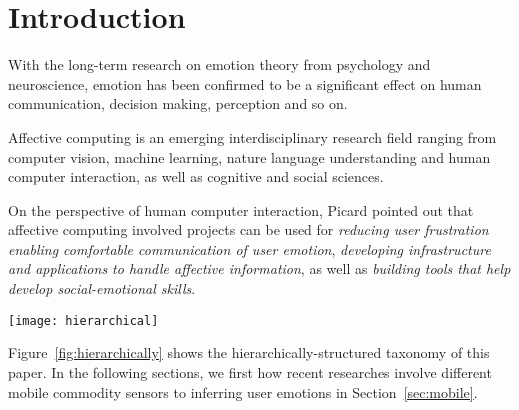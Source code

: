 \section{Introduction}\label{sec:intro}

With the long-term research on emotion theory from psychology and neuroscience\cite{james1884emotion, turkle2005second}, emotion has been confirmed to be a significant effect \cite{james2013emotion} on human communication, decision making, perception and so on.

Affective computing is an emerging interdisciplinary research field ranging from computer vision, machine learning, nature language understanding and human computer interaction, as well as cognitive and social sciences.

On the perspective of human computer interaction, Picard \cite{Picard1999} pointed out that affective computing involved projects can be used for \emph{reducing user frustration enabling comfortable communication of user emotion}, \emph{developing infrastructure and applications to handle affective information}, as well as \emph{building tools that help develop social-emotional skills}.




\begin{figure*}
    \centering
    \texttt{[image: hierarchical]}
    \caption{Hierarchically-structured taxonomy of this paper.}
    \label{fig:hierarchically}
\end{figure*}

Figure~\ref{fig:hierarchically} shows the hierarchically-structured taxonomy of this paper.
In the following sections, we first  how recent researches involve different mobile commodity sensors to inferring user emotions in Section~\ref{sec:mobile}. 

